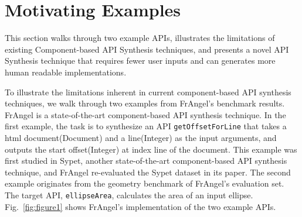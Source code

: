 
\section{Motivating Examples}
\label{sec:example}
This section walks through two example APIs, illustrates the limitations of existing Component-based API Synthesis techniques, and presents a novel API Synthesis technique that requires fewer user inputs and can generates more human readable implementations.

To illustrate the limitations inherent in current component-based API synthesis techniques, we walk through two examples from FrAngel's\cite{frangel} benchmark results. FrAngel is a state-of-the-art component-based API synthesis technique. In the first example, the task is to synthesize an API \texttt{getOffsetForLine} that takes a html document(Document) and a line(Integer) as the input arguments, and outputs the start offset(Integer) at index line of the document. This example was first studied in Sypet\cite{sypet}, another state-of-the-art component-based API synthesis technique, and FrAngel re-evaluated the Sypet dataset in its paper. The second example originates from the geometry benchmark of FrAngel's evaluation set. The target API, \texttt{ellipseArea}, calculates the area of an input ellipse. Fig.~\ref{fig:figure1} shows FrAngel's implementation of the two example APIs.

